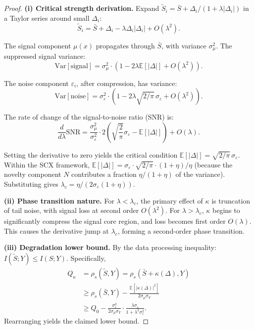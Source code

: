 \documentclass[12pt,a4paper]{article}
\theoremstyle{definition}
\newcommand{\E}{\mathbb{E}}
\newcommand{\Var}{\mathrm{Var}}
\begin{document}
\begin{proof}
\textbf{(i) Critical strength derivation.} Expand $\tilde{S}_i = \bar{S} + \Delta_i/(1+\lambda|\Delta_i|)$ in a Taylor series around small $\Delta_i$:
\begin{equation}
    \tilde{S}_i = \bar{S} + \Delta_i - \lambda\Delta_i|\Delta_i| + O(\lambda^2).
\end{equation}

The signal component $\mu(x)$ propagates through $\bar{S}$, with variance $\sigma_\mu^2$. The suppressed signal variance:
\begin{equation}
    \Var[\text{signal}] = \sigma_\mu^2 \cdot (1 - 2\lambda\E[|\Delta|] + O(\lambda^2)).
\end{equation}

The noise component $\varepsilon_i$, after compression, has variance:
\begin{equation}
    \Var[\text{noise}] = \sigma_\varepsilon^2 \cdot \left(1 - 2\lambda\sqrt{2/\pi}\,\sigma_\varepsilon + O(\lambda^2)\right).
\end{equation}

The rate of change of the signal-to-noise ratio (SNR) is:
\begin{equation}
    \frac{d}{d\lambda}\text{SNR} = \frac{\sigma_\mu^2}{\sigma_\varepsilon^2} \cdot 2\left(\sqrt{\frac{2}{\pi}}\sigma_\varepsilon - \E[|\Delta|]\right) + O(\lambda).
\end{equation}

Setting the derivative to zero yields the critical condition $\E[|\Delta|] = \sqrt{2/\pi}\,\sigma_\varepsilon$. Within the SCX framework, $\E[|\Delta|] = \sigma_\varepsilon \cdot \sqrt{2/\pi} \cdot (1+\eta)/\eta$ (because the novelty component $N$ contributes a fraction $\eta/(1+\eta)$ of the variance). Substituting gives $\lambda_c = \eta/(2\sigma_\varepsilon(1+\eta))$.

\textbf{(ii) Phase transition nature.} For $\lambda < \lambda_c$, the primary effect of $\kappa$ is truncation of tail noise, with signal loss at second order $O(\lambda^2)$. For $\lambda > \lambda_c$, $\kappa$ begins to significantly compress the signal core region, and loss becomes first order $O(\lambda)$. This causes the derivative jump at $\lambda_c$, forming a second-order phase transition.

\textbf{(iii) Degradation lower bound.} By the data processing inequality: $I(\tilde{S}; Y) \leq I(S; Y)$. Specifically,
\begin{align}
    Q_\kappa &= \rho_s(\tilde{S}, Y) = \rho_s(\bar{S} + \kappa(\Delta), Y) \\
    &\geq \rho_s(\bar{S}, Y) - \frac{\E[|\kappa(\Delta)|^2]}{2\sigma_\mu\sigma_Y} \\
    &\geq Q_0 - \frac{\sigma_\varepsilon^2}{2\sigma_\mu\sigma_Y} \cdot \frac{\lambda\sigma_\varepsilon}{1 + \lambda^2\sigma_\varepsilon^2}.
\end{align}
Rearranging yields the claimed lower bound.
\end{proof}
\end{document}
